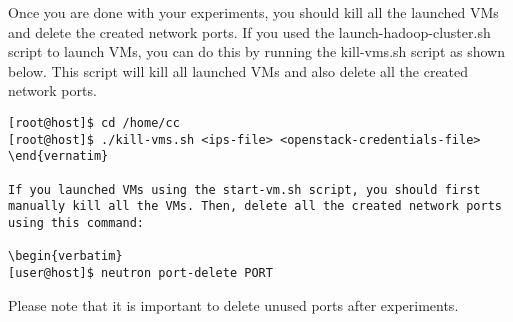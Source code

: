 Once you are done with your experiments, you should kill all the launched VMs and delete the created network ports. If you used the launch-hadoop-cluster.sh script to launch VMs, you can do this by running the kill-vms.sh script as shown below. This script will kill all launched VMs and also delete all the created network ports.

\begin{verbatim}
[root@host]$ cd /home/cc                                                                 
[root@host]$ ./kill-vms.sh <ips-file> <openstack-credentials-file>
\end{vernatim}

If you launched VMs using the start-vm.sh script, you should first manually kill all the VMs. Then, delete all the created network ports using this command:

\begin{verbatim}
[user@host]$ neutron port-delete PORT
\end{verbatim}

Please note that it is important to delete unused ports after experiments.
